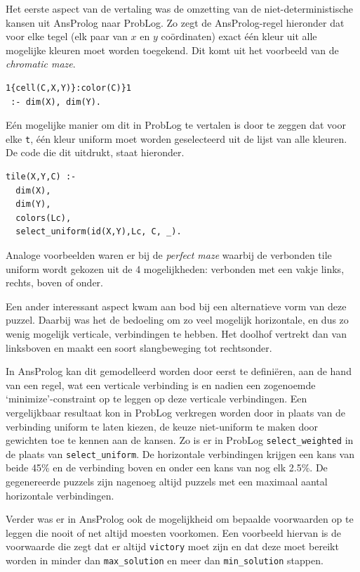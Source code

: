 \documentclass{article}
\begin{document}
Het eerste aspect van de vertaling was de omzetting van de niet-deterministische kansen uit AnsProlog naar ProbLog. Zo zegt de AnsProlog-regel hieronder dat voor elke tegel (elk paar van $x$ en $y$ co\"ordinaten) exact \'e\'en kleur uit alle mogelijke kleuren moet worden toegekend. Dit komt uit het voorbeeld van de \textit{chromatic maze}.
	 
\begin{lstlisting}[language=Prolog-pretty]
1{cell(C,X,Y)}:color(C)}1 
 :- dim(X), dim(Y).
\end{lstlisting}

E\'en mogelijke manier om dit in ProbLog te vertalen is door te zeggen dat voor elke \texttt{t}, \'e\'en kleur uniform moet worden geselecteerd uit de lijst van alle kleuren. De code die dit uitdrukt, staat hieronder.
\begin{lstlisting}[language=Prolog-pretty]
tile(X,Y,C) :-
  dim(X),
  dim(Y),
  colors(Lc),
  select_uniform(id(X,Y),Lc, C, _).
\end{lstlisting}

Analoge voorbeelden waren er bij de \textit{perfect maze} waarbij de verbonden tile uniform wordt gekozen uit de 4 mogelijkheden: verbonden met een vakje links, rechts, boven of onder. 

Een ander interessant aspect kwam aan bod bij een alternatieve vorm van deze puzzel. Daarbij was het de bedoeling om zo veel mogelijk horizontale, en dus zo wenig mogelijk verticale, verbindingen te hebben. Het doolhof vertrekt dan van linksboven en maakt een soort slangbeweging tot rechtsonder. 

In AnsProlog kan dit gemodelleerd worden door eerst te defini\"eren, aan de hand van een regel, wat een verticale verbinding is en nadien een zogenoemde `minimize'-constraint op te leggen op deze verticale verbindingen. Een vergelijkbaar resultaat kon in ProbLog verkregen worden door in plaats van de verbinding uniform te laten kiezen, de keuze niet-uniform te maken door gewichten toe te kennen aan de kansen. Zo is er in ProbLog \texttt{select\_weighted} in de plaats van \texttt{select\_uniform}. De horizontale verbindingen krijgen een kans van beide 45\% en de verbinding boven en onder een kans van nog elk 2.5\%. De gegenereerde puzzels zijn nagenoeg altijd puzzels met een maximaal aantal horizontale verbindingen.

Verder was er in AnsProlog ook de mogelijkheid om bepaalde voorwaarden op te leggen die nooit of net altijd moesten voorkomen. Een voorbeeld hiervan is de voorwaarde die zegt dat er altijd \texttt{victory} moet zijn en dat deze moet bereikt worden in minder dan \texttt{max\_solution} en meer dan \texttt{min\_solution} stappen.
\end{document}
